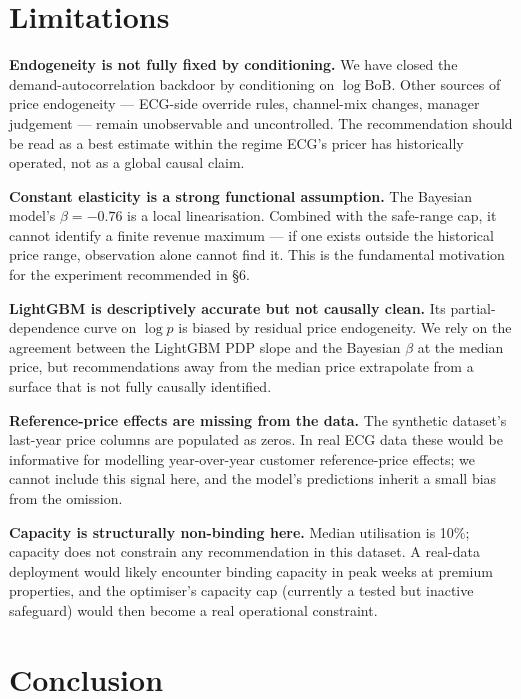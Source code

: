 \documentclass[11pt,a4paper]{article}
\begin{document}
\section{Limitations}

\textbf{Endogeneity is not fully fixed by conditioning.} We have closed the demand-autocorrelation backdoor by conditioning on $\log\mathrm{BoB}$. Other sources of price endogeneity --- ECG-side override rules, channel-mix changes, manager judgement --- remain unobservable and uncontrolled. The recommendation should be read as a best estimate within the regime ECG's pricer has historically operated, not as a global causal claim.

\textbf{Constant elasticity is a strong functional assumption.} The Bayesian model's $\beta = -0.76$ is a local linearisation. Combined with the safe-range cap, it cannot identify a finite revenue maximum --- if one exists outside the historical price range, observation alone cannot find it. This is the fundamental motivation for the experiment recommended in §6.

\textbf{LightGBM is descriptively accurate but not causally clean.} Its partial-dependence curve on $\log p$ is biased by residual price endogeneity. We rely on the agreement between the LightGBM PDP slope and the Bayesian $\beta$ at the median price, but recommendations away from the median price extrapolate from a surface that is not fully causally identified.

\textbf{Reference-price effects are missing from the data.} The synthetic dataset's last-year price columns are populated as zeros. In real ECG data these would be informative for modelling year-over-year customer reference-price effects; we cannot include this signal here, and the model's predictions inherit a small bias from the omission.

\textbf{Capacity is structurally non-binding here.} Median utilisation is 10\%; capacity does not constrain any recommendation in this dataset. A real-data deployment would likely encounter binding capacity in peak weeks at premium properties, and the optimiser's capacity cap (currently a tested but inactive safeguard) would then become a real operational constraint.

\section{Conclusion}
\end{document}
